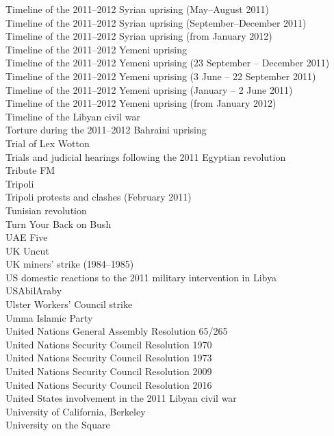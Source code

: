 Timeline of the 2011–2012 Syrian uprising (May–August 2011)\\
Timeline of the 2011–2012 Syrian uprising (September–December 2011)\\
Timeline of the 2011–2012 Syrian uprising (from January 2012)\\
Timeline of the 2011–2012 Yemeni uprising\\
Timeline of the 2011–2012 Yemeni uprising (23 September – December 2011)\\
Timeline of the 2011–2012 Yemeni uprising (3 June – 22 September 2011)\\
Timeline of the 2011–2012 Yemeni uprising (January – 2 June 2011)\\
Timeline of the 2011–2012 Yemeni uprising (from January 2012)\\
Timeline of the Libyan civil war\\
Torture during the 2011–2012 Bahraini uprising\\
Trial of Lex Wotton\\
Trials and judicial hearings following the 2011 Egyptian revolution\\
Tribute FM\\
Tripoli\\
Tripoli protests and clashes (February 2011)\\
Tunisian revolution\\
Turn Your Back on Bush\\
UAE Five\\
UK Uncut\\
UK miners' strike (1984–1985)\\
US domestic reactions to the 2011 military intervention in Libya\\
USAbilAraby\\
Ulster Workers' Council strike\\
Umma Islamic Party\\
United Nations General Assembly Resolution 65/265\\
United Nations Security Council Resolution 1970\\
United Nations Security Council Resolution 1973\\
United Nations Security Council Resolution 2009\\
United Nations Security Council Resolution 2016\\
United States involvement in the 2011 Libyan civil war\\
University of California, Berkeley\\
University on the Square\\
